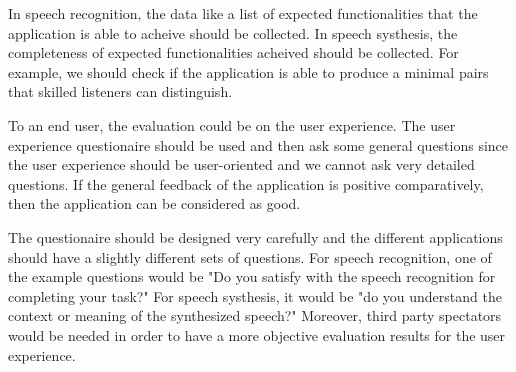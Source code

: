 \documentclass[12pt]{article}
\newenvironment{problem}[2][Problem]{\begin{trivlist}
\item[\hskip \labelsep {\bfseries #1}\hskip \labelsep {\bfseries #2.}]}{\end{trivlist}}
\begin{document}
\begin{problem}{5.2}
    In speech recognition, the data like a list of expected functionalities that 
    the application is able to acheive should be collected. In speech systhesis,
    the completeness of expected functionalities acheived
    should be collected. For example, we should check if the application is able
    to produce a minimal pairs that skilled listeners can distinguish.

    To an end user, the evaluation could be on the user experience. 
    The user experience questionaire should be used and then ask some general
    questions since the user experience should be user-oriented and we cannot
    ask very detailed questions. If the general feedback of the application is 
    positive comparatively, then the application can be considered as good.

    The questionaire should be designed very carefully and the different applications
    should have a slightly different sets of questions. 
    For speech recognition, one of the example questions would be "Do you satisfy
    with the speech recognition for completing your task?"
    For speech systhesis, it would be "do you understand the context or meaning
    of the synthesized speech?" 
    Moreover, third party spectators would be needed in order to have a more objective
    evaluation results for the user experience.
\end{problem}
\pagebreak
\end{document}
